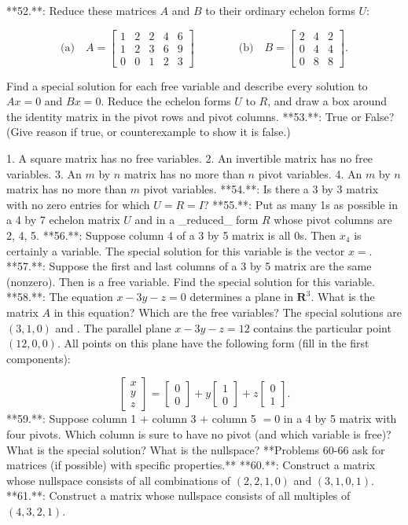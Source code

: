 

**52.**: Reduce these matrices \(A\) and \(B\) to their ordinary echelon forms \(U\):

\[\text{(a)}\quad A=\begin{bmatrix}1&2&2&4&6\\ 1&2&3&6&9\\ 0&0&1&2&3\end{bmatrix}\qquad\qquad\text{(b)}\quad B=\begin{bmatrix}2&4&2\\ 0&4&4\\ 0&8&8\end{bmatrix}.\]

Find a special solution for each free variable and describe every solution to \(Ax=0\) and \(Bx=0\). Reduce the echelon forms \(U\) to \(R\), and draw a box around the identity matrix in the pivot rows and pivot columns.
**53.**: True or False? (Give reason if true, or counterexample to show it is false.)

1. A square matrix has no free variables.
2. An invertible matrix has no free variables.
3. An \(m\) by \(n\) matrix has no more than \(n\) pivot variables.
4. An \(m\) by \(n\) matrix has no more than \(m\) pivot variables.
**54.**: Is there a 3 by 3 matrix with no zero entries for which \(U=R=I\)?
**55.**: Put as many 1s as possible in a 4 by 7 echelon matrix \(U\) and in a _reduced_ form \(R\) whose pivot columns are 2, 4, 5.
**56.**: Suppose column 4 of a 3 by 5 matrix is all 0s. Then \(x_{4}\) is certainly a variable. The special solution for this variable is the vector \(x=\).
**57.**: Suppose the first and last columns of a 3 by 5 matrix are the same (nonzero). Then is a free variable. Find the special solution for this variable.
**58.**: The equation \(x-3y-z=0\) determines a plane in \(\mathbf{R}^{3}\). What is the matrix \(A\) in this equation? Which are the free variables? The special solutions are \((3,1,0)\) and . The parallel plane \(x-3y-z=12\) contains the particular point \((12,0,0)\). All points on this plane have the following form (fill in the first components):

\[\begin{bmatrix}x\\ y\\ z\end{bmatrix}=\begin{bmatrix}0\\ 0\end{bmatrix}+y\begin{bmatrix}1\\ 0\end{bmatrix}+z\begin{bmatrix}0\\ 1\end{bmatrix}.\]
**59.**: Suppose column 1 \(+\) column 3 \(+\) column 5 \(=0\) in a 4 by 5 matrix with four pivots. Which column is sure to have no pivot (and which variable is free)? What is the special solution? What is the nullspace?
**Problems 60-66 ask for matrices (if possible) with specific properties.**
**60.**: Construct a matrix whose nullspace consists of all combinations of \((2,2,1,0)\) and \((3,1,0,1)\).
**61.**: Construct a matrix whose nullspace consists of all multiples of \((4,3,2,1)\).

